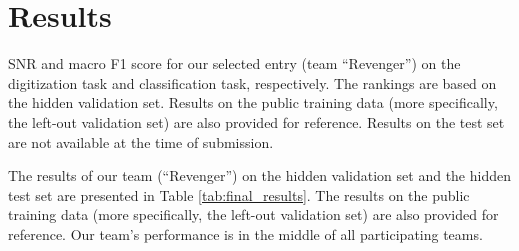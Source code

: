 \section{Results}
\label{sec:results}

\begin{table}[!htp]
\centering

\caption{SNR and macro F1 score for our selected entry (team ``Revenger'') on the digitization task and classification task, respectively. The rankings are based on the hidden validation set. Results on the public training data (more specifically, the left-out validation set) are also provided for reference. Results on the test set are not available at the time of submission.}
\label{tab:final_results}
\end{table}

The results of our team (``Revenger'') on the hidden validation set and the hidden test set are presented in Table \ref{tab:final_results}. The results on the public training data (more specifically, the left-out validation set) are also provided for reference. Our team's performance is in the middle of all participating teams.
